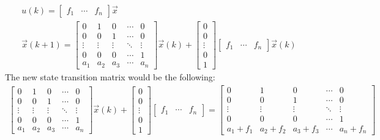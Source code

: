 \begin{align*}
    u(k) = \begin{bmatrix}
        f_1 & \cdots & f_n
        \end{bmatrix} \vec{x} \\
    \vec{x}(k + 1) = \begin{bmatrix}
        0 & 1 & 0 & \cdots & 0 \\
        0 & 0 & 1 & \cdots & 0 \\
        \vdots & \vdots & \vdots & \ddots & \vdots \\
        0 & 0 & 0 & \cdots & 1 \\
        a_1 & a_2 & a_3 & \cdots & a_n
    \end{bmatrix} \vec{x}(k) + \begin{bmatrix}
        0 \\ 0 \\ \vdots \\ 0 \\ 1
    \end{bmatrix} \begin{bmatrix}
        f_1 & \cdots & f_n
        \end{bmatrix} \vec{x}(k)
\end{align*}
The new state transition matrix would be the following:
\begin{align*}
    \begin{bmatrix}
        0 & 1 & 0 & \cdots & 0 \\
        0 & 0 & 1 & \cdots & 0 \\
        \vdots & \vdots & \vdots & \ddots & \vdots \\
        0 & 0 & 0 & \cdots & 1 \\
        a_1 & a_2 & a_3 & \cdots & a_n
    \end{bmatrix} \vec{x}(k) + \begin{bmatrix}
        0 \\ 0 \\ \vdots \\ 0 \\ 1
    \end{bmatrix} \begin{bmatrix}
        f_1 & \cdots & f_n
        \end{bmatrix} = \begin{bmatrix}
        0 & 1 & 0 & \cdots & 0 \\
        0 & 0 & 1 & \cdots & 0 \\
        \vdots & \vdots & \vdots & \ddots & \vdots \\
        0 & 0 & 0 & \cdots & 1 \\
        a_1 + f_1 & a_2 + f_2 & a_3 + f_3 & \cdots & a_n + f_n
    \end{bmatrix}
\end{align*}
